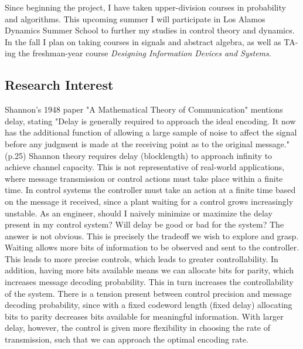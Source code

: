 \documentclass[10pt]{article}
\begin{document}
Since beginning the project, I have taken upper-division courses in probability and algorithms. This upcoming summer I will participate in Los Alamos Dynamics Summer School to further my studies in control theory and dynamics. In the fall I plan on taking courses in signals and abstract algebra, as well as TA-ing the freshman-year course \textit{Designing Information Devices and Systems}.

\subsection*{Research Interest}
Shannon's 1948 paper "A Mathematical Theory of Communication" mentions delay, stating "Delay is generally required to approach the ideal encoding. It now has the additional function of allowing a large sample of noise to affect the signal before any judgment is made at the receiving point as to the original message." (p.25) Shannon theory requires delay (blocklength) to approach infinity to achieve channel capacity. This is not representative of real-world applications, where message transmission or control actions must take place within a finite time. In control systems the controller must take an action at a finite time based on the message it received, since a plant waiting for a control grows increasingly unstable. As an engineer, should I naively minimize or maximize the delay present in my control system? Will delay be good or bad for the system? The answer is not obvious. This is precisely the tradeoff we wish to explore and grasp.\\


Waiting allows more bits of information to be observed and sent to the controller. This leads to more precise controls, which leads to greater controllability. In addition, having more bits available means we can allocate bits for parity, which increases message decoding probability. This in turn increases the controllability of the system. There is a tension present between control precision and message decoding probability, since with a fixed codeword length (fixed delay) allocating bits to parity decreases bits available for meaningful information. With larger delay, however, the control is given more flexibility in choosing the rate of transmission, such that we can approach the optimal encoding rate. \\
\end{document}
